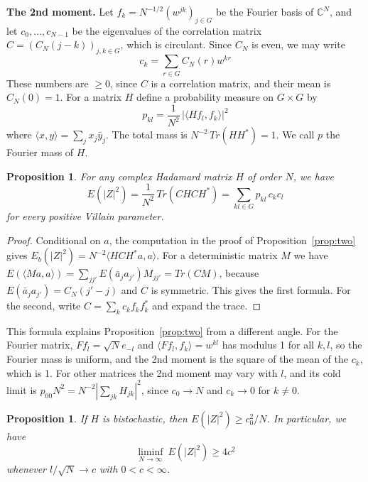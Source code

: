 \documentclass[11pt,a4paper]{article}
\newtheorem{prop}[thm]{Proposition}
\theoremstyle{remark}
\begin{document}
\medskip

\noindent\textbf{The 2nd moment.} Let $f_k=N^{-1/2}(w^{jk})_{j\in G}$ be the Fourier basis of $\mathbb C^N$, and let $c_0,\ldots,c_{N-1}$ be the eigenvalues of the correlation matrix $C=(C_N(j-k))_{j,k\in G}$, which is circulant. Since $C_N$ is even, we may write
\[
 c_k=\sum_{r\in G}C_N(r)w^{kr}
\]
These numbers are $\geq0$, since $C$ is a correlation matrix, and their mean is $C_N(0)=1$. For a matrix $H$ define a probability measure on $G\times G$ by
\[
 p_{kl}=\frac1{N^2}\,|\langle Hf_l,f_k\rangle|^2
\]
where $\langle x,y\rangle=\sum_jx_j\bar y_j$. The total mass is $N^{-2}\,Tr(HH^*)=1$. We call $p$ the Fourier mass of $H$.

\begin{samepage}
\begin{prop}\label{prop:general2}
For any complex Hadamard matrix $H$ of order $N$, we have
\[
 E(|Z|^2)=\frac1{N^2}\,Tr(CHCH^*)=\sum_{kl\in G}p_{kl}\,c_kc_l
\]
for every positive Villain parameter.
\end{prop}
\end{samepage}

\begin{proof}
Conditional on $a$, the computation in the proof of Proposition~\ref{prop:two} gives $E_b(|Z|^2)=N^{-2}\langle HCH^*a,a\rangle$. For a deterministic matrix $M$ we have $E(\langle Ma,a\rangle)=\sum_{jj'}E(\bar a_ja_{j'})M_{jj'}=Tr(CM)$, because $E(\bar a_ja_{j'})=C_N(j'-j)$ and $C$ is symmetric. This gives the first formula. For the second, write $C=\sum_kc_kf_kf_k^*$ and expand the trace.
\end{proof}

This formula explains Proposition~\ref{prop:two} from a different angle. For the Fourier matrix, $Ff_l=\sqrt N e_{-l}$ and $\langle Ff_l,f_k\rangle=w^{kl}$ has modulus 1 for all $k,l$, so the Fourier mass is uniform, and the 2nd moment is the square of the mean of the $c_k$, which is 1. For other matrices the 2nd moment may vary with $l$, and its cold limit is $p_{00}N^2=N^{-2}|\sum_{jk}H_{jk}|^2$, since $c_0\to N$ and $c_k\to0$ for $k\neq0$.

\begin{samepage}
\begin{prop}\label{prop:bist2}
If $H$ is bistochastic, then $E(|Z|^2)\geq c_0^2/N$. In particular, we have
\[
 \liminf_{N\to\infty}\ E(|Z|^2)\geq4c^2
\]
whenever $l/\sqrt N\to c$ with $0<c<\infty$.
\end{prop}
\end{samepage}
\end{document}
